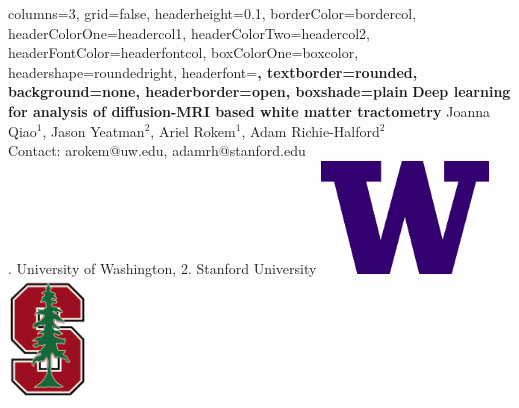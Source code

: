 \documentclass[a0paper,landscape,fontscale=0.365]{baposter}
\begin{document}
\begin{poster}{
    columns=3,
    grid=false,
    headerheight=0.1\textheight,
    borderColor=bordercol, %
    headerColorOne=headercol1, %
    headerColorTwo=headercol2, %
    headerFontColor=headerfontcol, %
    boxColorOne=boxcolor, %
    headershape=roundedright, %
    headerfont=\Large\sf\bf, %
    textborder=rounded,
    background=none,
    headerborder=open, %
    boxshade=plain
}
{}
%
%
{\sf\bf Deep learning for analysis of diffusion-MRI based white matter tractometry} %
{%
    \vspace{1em}
    Joanna Qiao{$^1$}, Jason Yeatman{$^2$}, Ariel Rokem{$^1$}, Adam Richie-Halford{$^2$}
    \\ Contact: arokem@uw.edu, adamrh@stanford.edu \hspace{0.5em} \null \\ %
    {. University of Washington, %
        2. Stanford University %
        \hfill %
    }
} %
{%
\includegraphics[align=c,height=3.00cm]{logos/UWlogo.png}%
\includegraphics[align=c,height=3.20cm]{logos/stanford_logo.png}%
}
\vspace{-10em}


\end{poster}
\end{document}
